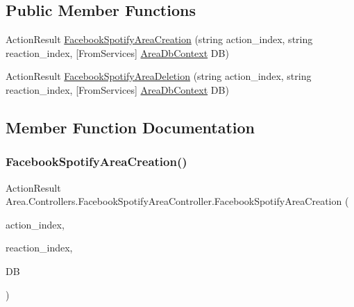 \subsection*{Public Member Functions}
\begin{DoxyCompactItemize}
\item 
Action\+Result \mbox{\hyperlink{classArea_1_1Controllers_1_1FacebookSpotifyAreaController_a7e7859f0e88380c50e0486e25344c822}{Facebook\+Spotify\+Area\+Creation}} (string action\+\_\+index, string reaction\+\_\+index, \mbox{[}From\+Services\mbox{]} \mbox{\hyperlink{classArea_1_1DAT_1_1AreaDbContext}{Area\+Db\+Context}} DB)
\item 
Action\+Result \mbox{\hyperlink{classArea_1_1Controllers_1_1FacebookSpotifyAreaController_ad03e220743db8b630b3f36e9f3e5dfcd}{Facebook\+Spotify\+Area\+Deletion}} (string action\+\_\+index, string reaction\+\_\+index, \mbox{[}From\+Services\mbox{]} \mbox{\hyperlink{classArea_1_1DAT_1_1AreaDbContext}{Area\+Db\+Context}} DB)
\end{DoxyCompactItemize}


\subsection{Member Function Documentation}
\mbox{\label{classArea_1_1Controllers_1_1FacebookSpotifyAreaController_a7e7859f0e88380c50e0486e25344c822}} 
\subsubsection{\texorpdfstring{Facebook\+Spotify\+Area\+Creation()}{FacebookSpotifyAreaCreation()}}
{\footnotesize\ttfamily Action\+Result Area.\+Controllers.\+Facebook\+Spotify\+Area\+Controller.\+Facebook\+Spotify\+Area\+Creation (\begin{DoxyParamCaption}\item[{string}]{action\+\_\+index,  }\item[{string}]{reaction\+\_\+index,  }\item[{\mbox{[}\+From\+Services\mbox{]} \mbox{\hyperlink{classArea_1_1DAT_1_1AreaDbContext}{Area\+Db\+Context}}}]{DB }\end{DoxyParamCaption})\hspace{0.3cm}{\ttfamily [inline]}}

